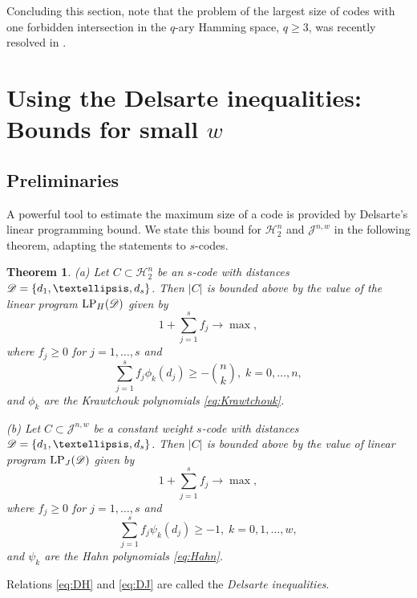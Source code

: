 \documentclass{amsart}
\newtheorem{theoremenv}[definitionenv]{Theorem}
\newenvironment{theorem}{\begin{theoremenv}\rm}{\end{theoremenv}}
\newcommand{\cH}{\mathcal{H}}
\newcommand{\cJ}{\mathcal{J}}
\begin{document}
Concluding this section, note that the problem of the largest size of codes with one forbidden intersection in the $q$-ary Hamming space, $q\ge 3$, was recently 
resolved in \cite{KLLM21}.

\section{Using the Delsarte inequalities: Bounds for small \texorpdfstring{$w$}. }\label{sec:small-w}

\subsection{Preliminaries}
A powerful tool to estimate the maximum size of a code is provided by Delsarte's linear programming bound. We state this bound for
$\cH_2^n$ and $\cJ^{n,w}$ in the following theorem, adapting the statements to $s$-codes.

\begin{theorem}\cite{D73} \label{thm:del}
(a) Let $C \subset \cH_{2}^{n}$ be an $s$-code with distances $\sD= \{d_{1}, \dots, d_{s}\}$. Then $|C|$ is bounded above
by the value of the linear program $\text{LP}_{H}(\mathscr{D})$ given by
    \begin{equation}\label{eq:LPH}
    1+\sum_{j=1}^s f_j \to \max,
    \end{equation}
where $f_{j} \geq 0$ for $j = 1, \dots, s$ and
  \begin{equation}\label{eq:DH}
  \sum_{j = 1}^{s} f_{j} \phi_{k}(d_{j}) \geq -\binom nk,\; k=0,\dots, n,
  \end{equation}
and $\phi_k$ are the Krawtchouk polynomials \eqref{eq:Krawtchouk}.
  
(b) Let $C \subset \cJ^{n, w}$ be a constant weight $s$-code with  distances $\sD=\{d_{1}, \dots, d_{s}\}$. Then
$|C|$ is bounded above by the value of linear program $\text{{LP}$_{J}$}(\mathscr{D})$ given by
  \begin{equation}\label{eq:LPJ}
 1+\sum_{j = 1}^{ s}f_{j} \to\max,
  \end{equation}
where $f_j\ge 0$ for $j=1,\dots,s$ and
  \begin{equation}\label{eq:DJ}
  \sum_{j = 1}^ s f_{j} \psi_{k}(d_{j}) \geq -1,\;  k=0,1,\dots,w,
  \end{equation}
and $\psi_k$ are the Hahn polynomials \eqref{eq:Hahn}.
\end{theorem}
Relations \eqref{eq:DH} and \eqref{eq:DJ} are called the {\em Delsarte inequalities}.
\end{document}
